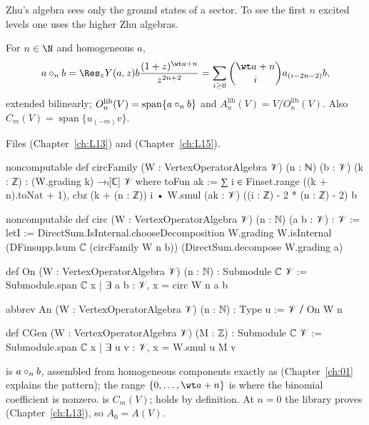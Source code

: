 Zhu's algebra sees only the ground states of a sector. To see the first $n$ excited levels one uses the higher
Zhu algebras.

\begin{definition}\label{l12:def:an}
For $n\in\N$ and homogeneous $a$,
\begin{equation*}
 a\ltwelvecirc_n b = \Res_zY(a,z)b\frac{(1+z)^{\wt a+n}}{z^{2n+2}} = \sum_{i\ge0}\binom{\wt a+n}{i}a_{(i-2n-2)}b,
\end{equation*}
extended bilinearly; $O_n^{\mathrm{lib}}(V) = \operatorname{span}\{a\circ_nb\}$ and
$A_n^{\mathrm{lib}}(V) = V/O_n^{\mathrm{lib}}(V)$. Also $C_m(V) = \operatorname{span}\{u_{(-m)}v\}$.
\end{definition}
\noindent Files  (Chapter~\ref{ch:L13}) and
 (Chapter~\ref{ch:L15}).
\begin{leancode}
noncomputable def circFamily (W : VertexOperatorAlgebra 𝒱) (n : ℕ) (b : 𝒱) (k : ℤ) :
    (W.grading k) →ₗ[ℂ] 𝒱 where
  toFun ak := ∑ i ∈ Finset.range ((k + n).toNat + 1),
    cbz (k + (n : ℤ)) i • W.smul (ak : 𝒱) ((i : ℤ) - 2 * (n : ℤ) - 2) b

noncomputable def circ (W : VertexOperatorAlgebra 𝒱) (n : ℕ) (a b : 𝒱) : 𝒱 :=
  letI := DirectSum.IsInternal.chooseDecomposition W.grading W.isInternal
  (DFinsupp.lsum ℂ (circFamily W n b)) (DirectSum.decompose W.grading a)

def On (W : VertexOperatorAlgebra 𝒱) (n : ℕ) : Submodule ℂ 𝒱 :=
  Submodule.span ℂ {x | ∃ a b : 𝒱, x = circ W n a b}

abbrev An (W : VertexOperatorAlgebra 𝒱) (n : ℕ) : Type u := 𝒱 ⧸ On W n

def CGen (W : VertexOperatorAlgebra 𝒱) (M : ℤ) : Submodule ℂ 𝒱 :=
  Submodule.span ℂ {x | ∃ u v : 𝒱, x = W.smul u M v}
\end{leancode}

\begin{dictionary}
 is $a\circ_nb$, assembled from homogeneous components exactly as  (Chapter~\ref{ch:01}
explains the  pattern); the range $\{0,\dots,\wt a+n\}$ is where the binomial coefficient is
nonzero.  is $C_m(V)$;  holds by definition. At $n=0$ the
library proves  (Chapter~\ref{ch:L13}), so $A_0 = A(V)$.
\end{dictionary}

